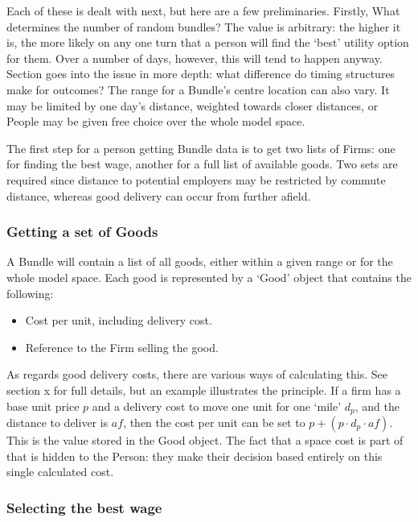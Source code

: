 Each of these is dealt with next, but here are a few preliminaries. Firstly, What determines the number of random bundles? The value is arbitrary: the higher it is, the more likely on any one turn that a person will find the `best' utility option for them. Over a number of days, however, this will tend to happen anyway. Section  goes into the issue in more depth: what difference do timing structures make for outcomes? The range for a Bundle's centre location can also vary. It may be limited by one day's distance, weighted towards closer distances, or People may be given free choice over the whole model space.

The first step for a person getting Bundle data is to get two lists of Firms: one for finding the best wage, another for a full list of available goods. Two sets are required since distance to potential employers may be restricted by commute distance, whereas good delivery can occur from further afield.

\subsubsection{Getting a set of Goods} 

A Bundle will contain a list of all goods, either within a given range or for the whole model space. Each good is represented by a `Good' object that contains the following:

\begin{itemize}
	\item Cost per unit, including delivery cost.  
	\item Reference to the Firm selling the good.
\end{itemize}

As regards good delivery costs, there are various ways of calculating this. See section x  for full details, but an example illustrates the principle. If a firm has a base unit price $p$ and a delivery cost to move one unit for one `mile' $d_{p}$, and the distance to deliver is $af$, then the cost per unit can be set to $p + (p\cdot d_{p}\cdot af)$. This is the value stored in the Good object. The fact that a space cost is part of that is hidden to the Person: they make their decision based entirely on this single calculated cost.

\subsubsection{Selecting the best wage \label{sec:wageselect}}

